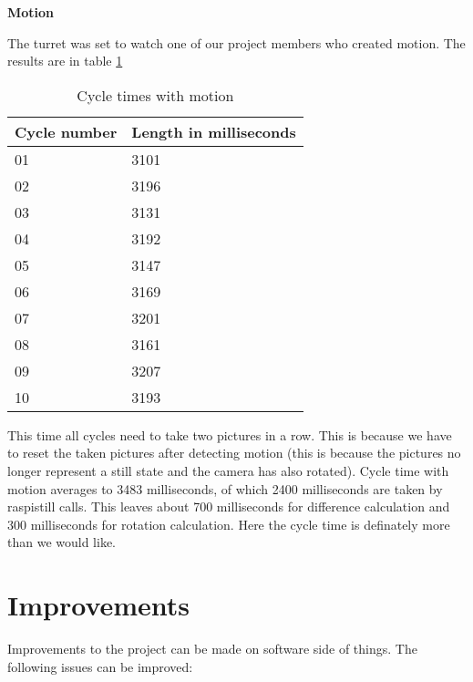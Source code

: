 \documentclass[english,11pt,twoside,a4paper]{article}
\begin{document}
\textbf{Motion}

The turret was set to watch one of our project members who created motion. The results are in table \ref{cycle_times_motion}

\begin{table}[ht]
  \begin{center}
    \begin{tabular}{| l | l |}
      \hline
      Cycle number & Length in milliseconds \\ \hline
      01 & 3101 \\ \hline
      02 & 3196 \\ \hline
      03 & 3131 \\ \hline
      04 & 3192 \\ \hline
      05 & 3147 \\ \hline
      06 & 3169 \\ \hline
      07 & 3201 \\ \hline
      08 & 3161 \\ \hline
      09 & 3207 \\ \hline
      10 & 3193 \\ \hline
    \end{tabular}
    \caption{Cycle times with motion}
  \end{center}
  \label{cycle_times_motion}
\end{table}

This time all cycles need to take two pictures in a row. This is because we have to reset the taken pictures after detecting motion (this is because the pictures no longer represent a still state and the camera has also rotated). Cycle time with motion averages to 3483 milliseconds, of which 2400 milliseconds are taken by raspistill calls. This leaves about 700 milliseconds for difference calculation and 300 milliseconds for rotation calculation. Here the cycle time is definately more than we would like.

\section{Improvements}

Improvements to the project can be made on software side of things. The following issues can be improved:
\end{document}
